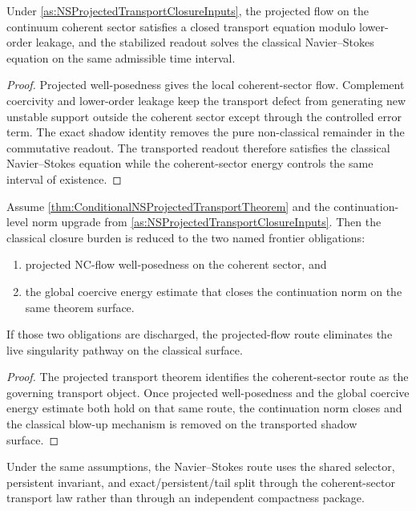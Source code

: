 \begin{theorem}\label{thm:ConditionalNSProjectedTransportTheorem}
Under \cref{as:NSProjectedTransportClosureInputs}, the projected flow on the continuum coherent sector satisfies a closed transport equation modulo lower-order leakage, and the stabilized readout solves the classical Navier--Stokes equation on the same admissible time interval.
\end{theorem}

\begin{proof}
Projected well-posedness gives the local coherent-sector flow.
Complement coercivity and lower-order leakage keep the transport defect from generating new unstable support outside the coherent sector except through the controlled error term.
The exact shadow identity removes the pure non-classical remainder in the commutative readout.
The transported readout therefore satisfies the classical Navier--Stokes equation while the coherent-sector energy controls the same interval of existence.
\end{proof}

\begin{theorem}\label{thm:ConditionalNSClassicalClosurePacket}
Assume \cref{thm:ConditionalNSProjectedTransportTheorem} and the continuation-level norm upgrade from \cref{as:NSProjectedTransportClosureInputs}.
Then the classical closure burden is reduced to the two named frontier obligations:
\begin{enumerate}
  \item projected NC-flow well-posedness on the coherent sector, and
  \item the global coercive energy estimate that closes the continuation norm on the same theorem surface.
\end{enumerate}
If those two obligations are discharged, the projected-flow route eliminates the live singularity pathway on the classical surface.
\end{theorem}

\begin{proof}
The projected transport theorem identifies the coherent-sector route as the governing transport object.
Once projected well-posedness and the global coercive energy estimate both hold on that same route, the continuation norm closes and the classical blow-up mechanism is removed on the transported shadow surface.
\end{proof}

\begin{corollary}\label{cor:NSImportToTheSharedCarrierPicture}
Under the same assumptions, the Navier--Stokes route uses the shared selector, persistent invariant, and exact/persistent/tail split through the coherent-sector transport law rather than through an independent compactness package.
\end{corollary}

